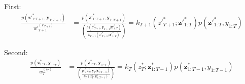 \documentclass[11pt]{article}
\newcommand{\z}{\mathbf{z}}
\newcommand{\y}{\mathbf{y}}
\begin{document}
First:
\begin{align*}
\frac{p({\z'}_{1:T+1}^*, \y_{1:T+1})}{{w'}_{T+1}^{(I'_{T+1})}}
    &= \frac{p({\z'}_{1:T+1}^*, \y_{1:T+1})}
            {\left(\frac{p({z'}_{T+1}^*, \y_{T+1} | {\z'}_{1:T}^*)}{k_{T+1}({z'}_{T+1}^{*}; {\z'}_{1:T}^{*})}\right)}
    = k_{T+1}({z'}_{T+1}^{*}; {\z'}_{1:T}^{*}) p({\z'}_{1:T}^*, y_{1:T})
\end{align*}

Second:
\begin{align*}
\frac{p({\z}_{1:T}^*, \y_{1:T})}{{w}_{T}^{(I_{T})}}
    &= \frac{p({\z}_{1:T}^*, \y_{1:T})}
            {\left(\frac{p({z}_{T}^*, \y_{T} | {\z}_{1:T-1}^*)}{k_{T}({z}_{T}^{*}; {\z}_{1:T-1}^{*})}\right)}
    = k_{T}({z}_{T}^{*}; {\z}_{1:T-1}^{*}) p({\z}_{1:T-1}^*, y_{1:T-1})
\end{align*}
\end{document}
